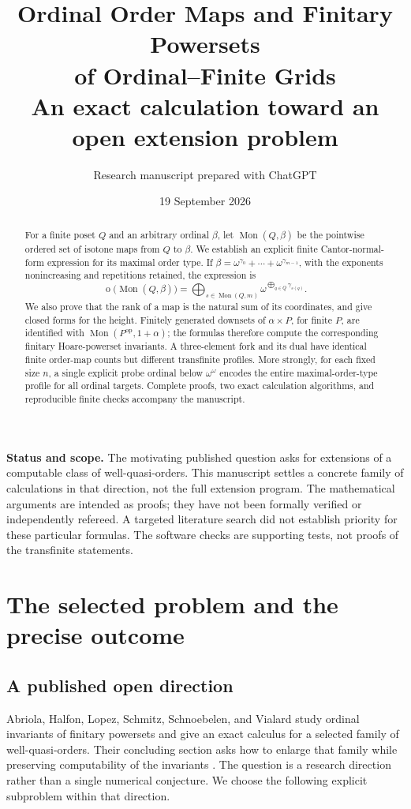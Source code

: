 \documentclass[11pt,a4paper]{article}
\title{\color{InkBlue}\LARGE\bfseries Ordinal Order Maps and Finitary Powersets\\[4pt]
  of Ordinal--Finite Grids\\[10pt]
  \large\normalfont An exact calculation toward an open extension problem}
\author{Research manuscript prepared with ChatGPT}
\date{19 September 2026}
\theoremstyle{definition}
\theoremstyle{remark}
\newcommand{\Mon}{\operatorname{Mon}}
\newcommand{\otype}{\operatorname{o}}
\newcommand{\op}{\mathrm{op}}
\begin{document}
\maketitle
\thispagestyle{empty}
\begin{abstract}
For a finite poset $Q$ and an arbitrary ordinal $\beta$, let
$\Mon(Q,\beta)$ be the pointwise ordered set of isotone maps from $Q$ to
$\beta$. We establish an explicit finite Cantor-normal-form expression for its
maximal order type. If
$\beta=\omega^{\gamma_0}+\cdots+\omega^{\gamma_{m-1}}$, with the exponents
nonincreasing and repetitions retained, the expression is
\[
 \otype\bigl(\Mon(Q,\beta)\bigr)
 =\bigoplus_{s\in\Mon(Q,m)}
      \omega^{\bigoplus_{q\in Q}\gamma_{s(q)}}.
\]
We also prove that the rank of a map is the natural sum of its coordinates,
and give closed forms for the height. Finitely generated downsets of
$\alpha\times P$, for finite $P$, are identified with
$\Mon(P^{\op},1+\alpha)$; the formulas therefore compute the corresponding
finitary Hoare-powerset invariants. A three-element fork and its dual have
identical finite order-map counts but different transfinite profiles. More
strongly, for each fixed size $n$, a single explicit probe ordinal below
$\omega^\omega$ encodes the entire maximal-order-type profile for all ordinal
targets. Complete proofs, two exact calculation algorithms, and reproducible
finite checks accompany the manuscript.
\end{abstract}

\begin{resultbox}
\textbf{Status and scope.}
The motivating published question asks for extensions of a computable class
of well-quasi-orders. This manuscript settles a concrete family of
calculations in that direction, not the full extension program. The
mathematical arguments are intended as proofs; they have not been formally
verified or independently refereed. A targeted literature search did not
establish priority for these particular formulas. The software checks are
supporting tests, not proofs of the transfinite statements.
\end{resultbox}

\clearpage
\begingroup
\small
\setlength{\parskip}{0pt}
\tableofcontents
\endgroup
\clearpage

\section{The selected problem and the precise outcome}

\subsection{A published open direction}
Abriola, Halfon, Lopez, Schmitz, Schnoebelen, and Vialard study ordinal
invariants of finitary powersets and give an exact calculus for a selected
family of well-quasi-orders. Their concluding section asks how to enlarge
that family while preserving computability of the invariants
\cite[Section~6, ``Elementary wqos'']{AHLLSSV}.
The question is a research direction rather than a single numerical
conjecture. We choose the following explicit subproblem within that direction.
\end{document}
